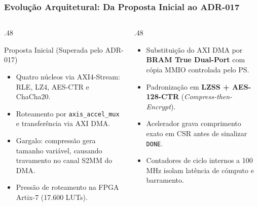 \documentclass[../main.tex]{subfiles}
\begin{document}
\begin{frame}
  \frametitle{Evolu\c{c}\~ao Arquitetural: Da Proposta Inicial ao ADR-017}
  \begin{columns}[T]
    \begin{column}{.48\textwidth}
      \begin{block}{Proposta Inicial (Superada pelo ADR-017)}
        \begin{itemize}
          \item Quatro n\'ucleos via AXI4-Stream: RLE, LZ4, AES-CTR e ChaCha20.
          \item Roteamento por \texttt{axis\_accel\_mux} e transfer\^encia via AXI DMA.
          \item Gargalo: compress\~ao gera tamanho vari\'avel, causando travamento no canal S2MM do DMA.
          \item Press\~ao de roteamento na FPGA Artix-7 (17.600 LUTs).
        \end{itemize}
      \end{block}
    \end{column}
    \begin{column}{.48\textwidth}
      \begin{pontoschave}
        \begin{itemize}
          \item Substitui\c{c}\~ao do AXI DMA por \textbf{BRAM True Dual-Port} com c\'opia MMIO controlada pelo PS.
          \item Padroniza\c{c}\~ao em \textbf{LZSS + AES-128-CTR} (\textit{Compress-then-Encrypt}).
          \item Acelerador grava comprimento exato em CSR antes de sinalizar \texttt{DONE}.
          \item Contadores de ciclo internos a 100 MHz isolam lat\^encia de c\'omputo e barramento.
        \end{itemize}
      \end{pontoschave}
    \end{column}
  \end{columns}
\end{frame}
\end{document}
